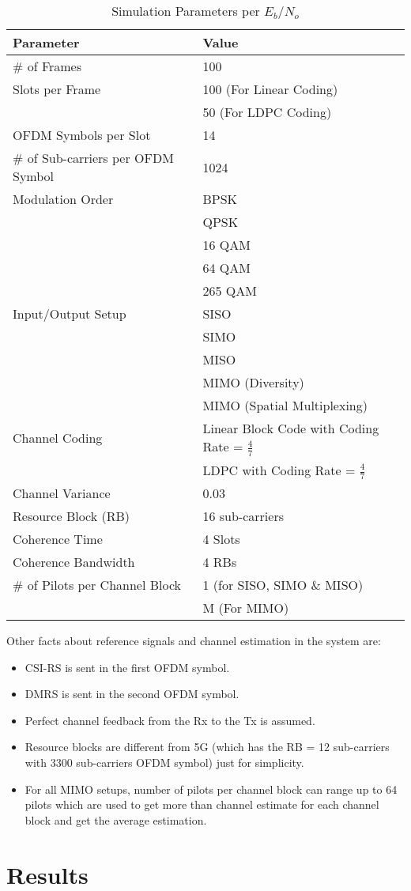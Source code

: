 \begin{table}[ht]
    \centering
    \caption{Simulation Parameters per $E_b$/$N_o$}
    \label{tbl:ch parameters}
    \begin{tabular}{ll}
        \toprule
        Parameter & Value \\
        \midrule
        \# of Frames & 100 \\
        Slots per Frame & 100 (For Linear Coding) \\
                        & 50 (For LDPC Coding) \\
        OFDM Symbols per Slot & 14 \\
        \# of Sub-carriers per OFDM Symbol & 1024 \\
        Modulation Order & BPSK \\
                         & QPSK \\
                         & 16 QAM \\
                         & 64 QAM \\
                         & 265 QAM \\
        Input/Output Setup & SISO \\
                           & SIMO \\
                           & MISO \\
                           & MIMO (Diversity) \\
                           & MIMO (Spatial Multiplexing) \\
        Channel Coding & Linear Block Code with Coding Rate = $\frac{4}{7}$ \\
                       & LDPC with Coding Rate = $\frac{4}{7}$ \\
        Channel Variance & 0.03 \\
        Resource Block (RB) & 16 sub-carriers \\
        Coherence Time & 4 Slots \\
        Coherence Bandwidth & 4 RBs \\ 
        \# of Pilots per Channel Block & 1 (for SISO, SIMO \& MISO) \\
        & M (For MIMO) \\
        \bottomrule
    \end{tabular}
\end{table}

Other facts about reference signals and channel estimation in the system are:
\begin{itemize}
    \item CSI-RS is sent in the first OFDM symbol.
    \item DMRS is sent in the second OFDM symbol.
    \item Perfect channel feedback from the Rx to the Tx is assumed.
    \item Resource blocks are different from 5G (which has the RB = 12 sub-carriers with 3300 sub-carriers OFDM symbol) just for simplicity.
    \item For all MIMO setups, number of pilots per channel block can range up to 64 pilots which are used to get more than channel estimate for each channel block and get the average estimation.
\end{itemize}

\section{Results}
